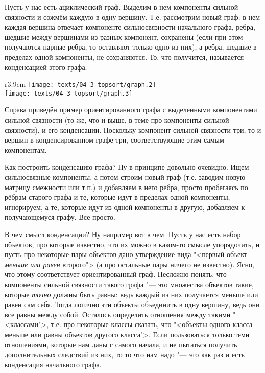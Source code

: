 Пусть у нас есть ациклический граф. Выделим в нем компоненты сильной связности и сожмём каждую в одну вершину. Т.е.
рассмотрим новый граф: в нем каждая вершина отвечает компоненте сильносвязности начального графа, ребра, шедшие между
вершинами из разных компонент, сохранены (если при этом получаются парные ребра, то оставляют только одно из них), а 
ребра, шедшие в пределах одной компоненты, не сохраняются. То, что получится, называется конденсацией этого графа. 
 
\begin{wrapfigure}{r}{3.9cm}
\vspace{-0.3cm}
\texttt{[image: texts/04\_3\_topsort/graph.2]}\\[0.2cm]
\texttt{[image: texts/04\_3\_topsort/graph.3]}
\end{wrapfigure}

Справа приведён пример ориентированного графа с выделенными компонентами сильной связности
(то же, что и выше, в теме про компоненты сильной связности), и
его конденсации. Поскольку компонент сильной связности три, то и вершин в конденсированном графе три, 
соответствующие этим самым компонентам.


Как построить конденсацию графа? Ну в принципе довольно очевидно. Ищем сильносвязные компоненты, а потом строим новый 
граф (т.е. заводим новую матрицу смежности или т.п.) и добавляем в него ребра,
просто пробегаясь по рёбрам старого графа и те, которые идут в пределах одной компоненты, игнорируем, а те, которые 
идут из одной компоненты в другую, добавляем к получающемуся графу. Все просто.

В чем смысл конденсации? Ну например вот в чем. Пусть у нас есть набор объектов, про которые известно, что их можно
в каком-то смысле упорядочить, и пусть про некоторые пары объектов дано утверждение вида 
"<первый объект \textit{меньше или равен} второго"> (а про остальные пары ничего не известно). 
Ясно, что этому соответствует ориентированный граф. Несложно
понять, что компоненты сильной связности такого графа "--- это множества объектов такие, которые \textit{точно} должны
быть равны: ведь каждый из них получается меньше или равен сам себя. Тогда логично эти объекты объединить в одну вершину,
ведь они все равны между собой. Осталось определить отношения между такими "<классами">, т.е. про некоторые классы
сказать, что "<объекты одного класса меньше или равны объектов другого класса">. Если пользоваться только теми отношениями,
которые нам даны с самого начала, и не пытаться получить дополнительных следствий из них, то то что нам надо "---
это как раз и есть конденсация начального графа.

